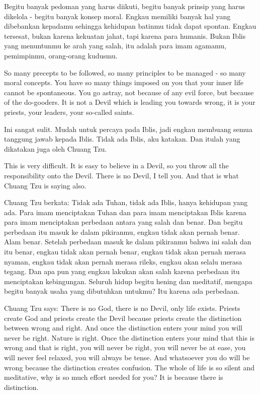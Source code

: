 \bahasa
Begitu banyak pedoman yang harus diikuti, begitu banyak prinsip yang harus dikelola - begitu banyak konsep moral. Engkau memiliki banyak hal yang dibebankan kepadamu sehingga kehidupan batinmu tidak dapat spontan. Engkau tersesat, bukan karena kekuatan jahat, tapi karena para humanis. Bukan Iblis yang menuntunmu ke arah yang salah, itu adalah para imam agamamu, pemimpinmu, orang-orang kudusmu.

\english
So many precepts to be followed, so many principles to be managed - so many moral concepts. You have so many things imposed on you that your inner life cannot be spontaneous. You go astray, not because of any evil force, but because of the do-gooders. It is not a Devil which is leading you towards wrong, it is your priests, your leaders, your so-called saints.

\bahasa
Ini sangat sulit. Mudah untuk percaya pada Iblis, jadi engkau membuang semua tanggung jawab kepada Iblis. Tidak ada Iblis, aku katakan. Dan itulah yang dikatakan juga oleh Chuang Tzu.

\english
This is very difficult. It is easy to believe in a Devil, so you throw all the responsibility onto the Devil. There is no Devil, I tell you. And that is what Chuang Tzu is saying also.

\bahasa
Chuang Tzu berkata: Tidak ada Tuhan, tidak ada Iblis, hanya kehidupan yang ada. Para imam menciptakan Tuhan dan para imam menciptakan Iblis karena para imam menciptakan perbedaan antara yang salah dan benar. Dan begitu perbedaan itu masuk ke dalam pikiranmu, engkau tidak akan pernah benar. Alam benar. Setelah perbedaan masuk ke dalam pikiranmu bahwa ini salah dan itu benar, engkau tidak akan pernah benar, engkau tidak akan pernah merasa nyaman, engkau tidak akan pernah merasa rileks, engkau akan selalu merasa tegang. Dan apa pun yang engkau lakukan akan salah karena perbedaan itu menciptakan kebingungan. Seluruh hidup begitu hening dan meditatif, mengapa begitu banyak usaha yang dibutuhkan untukmu? Itu karena ada perbedaan.

\english
Chuang Tzu says: There is no God, there is no Devil, only life exists. Priests create God and priests create the Devil because priests create the distinction between wrong and right. And once the distinction enters your mind you will never be right. Nature is right. Once the distinction enters your mind that this is wrong and that is right, you will never be right, you will never be at ease, you will never feel relaxed, you will always be tense. And whatsoever you do will be wrong because the distinction creates confusion. The whole of life is so silent and meditative, why is so much effort needed for you? It is because there is distinction.


